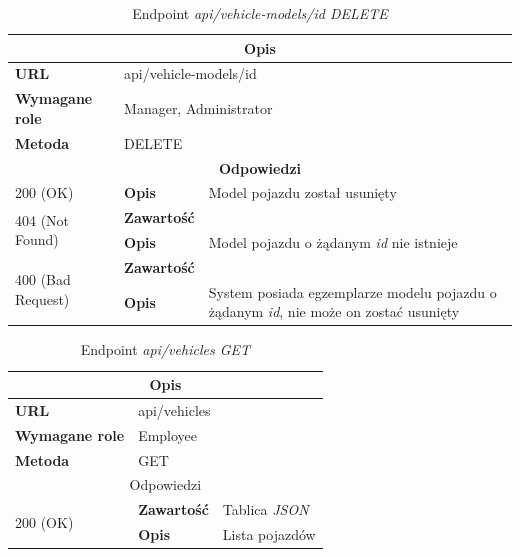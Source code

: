 \documentclass[eng,printmode,openany]{mgr}
\begin{document}
	\begin{table}[H]
		\caption{Endpoint \textit{api/vehicle-models/id DELETE}}
		\begin{tabularx}{\textwidth}{|l|l|X|}
			\hline
			\multicolumn{3}{|c|}{\textbf{\textbf{Opis}}}
			\\ \hline
			\textbf{URL}                       & \multicolumn{2}{l|}{api/vehicle-models/id}
			\\ \hline
			\textbf{Wymagane role}             & \multicolumn{2}{l|}{Manager, Administrator}
			\\ \hline
			\textbf{Metoda}                    & \multicolumn{2}{l|}{DELETE}
			\\ \hline
			\multicolumn{3}{|c|}{\textbf{Odpowiedzi}}
			\\ \hline
			200 (OK)			                & \textbf{Opis}         	& Model pojazdu został usunięty
			\\ \hline
			\multirow{2}{*}{404 (Not Found)} 	& \textbf{Zawartość}     & 
			\\ \cline{2-3}                      & \textbf{Opis}          & Model pojazdu o żądanym \textit{id} nie istnieje
			\\ \hline
			\multirow{2}{*}{400 (Bad Request)} 	& \textbf{Zawartość}     & 
			\\ \cline{2-3}                      & \textbf{Opis}          & System posiada egzemplarze modelu pojazdu o żądanym \textit{id}, nie może on zostać usunięty
			\\ \hline
		\end{tabularx}
	\end{table}
	
	\begin{table}[H]
		\caption{Endpoint \textit{api/vehicles GET}}
		\begin{tabularx}{\textwidth}{|l|l|X|}
			\hline
			\multicolumn{3}{|c|}{\textbf{\textbf{Opis}}}
			\\ \hline
			\textbf{URL}                         & \multicolumn{2}{l|}{api/vehicles}
			\\ \hline
			\textbf{Wymagane role}               & \multicolumn{2}{l|}{Employee}
			\\ \hline
			\textbf{Metoda}                      & \multicolumn{2}{l|}{GET}
			\\ \hline
			\multicolumn{3}{|c|}{ Odpowiedzi}
			\\ \hline
			\multirow{2}{*}{200 (OK)}   & \textbf{Zawartość}         & Tablica \textit{JSON}
			\\ \cline{2-3}              & \textbf{Opis}         	    & Lista pojazdów
			\\ \hline
		\end{tabularx}
	\end{table}
	
\end{document}
